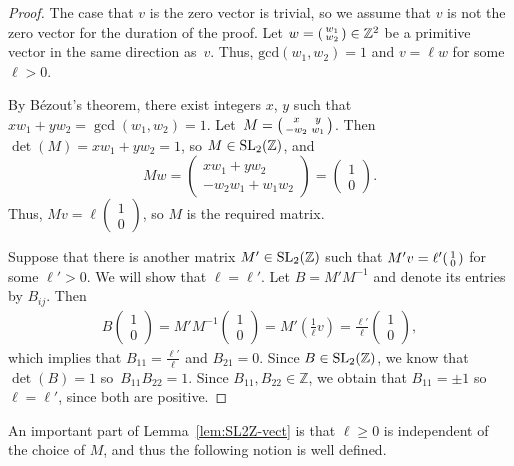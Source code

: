 \documentclass[10pt,a4paper]{amsart}
\numberwithin{equation}{section}
\newenvironment{psmallmatrix}
 {\left(\begin{smallmatrix}}
 {\end{smallmatrix}\right)}
\def\Z{{\mathbb Z}}
\newcommand{\SL}{{\rm SL}_2(\Z)}
\newcommand{\vect}[2]{\begin{psmallmatrix} #1 \\ #2 \end{psmallmatrix}}
\theoremstyle{definition}
\theoremstyle{plain}
\theoremstyle{plain}
\begin{document}
\begin{proof}
The case that $v$ is the zero vector is trivial, so we assume that $v$ is not the zero vector for the duration of the proof.
Let $w=\vect{w_1}{w_2}\in\Z^2$ be a primitive vector in the same direction as~$v$.
Thus, $\mathrm{gcd}(w_1,w_2)=1$ and $v = \ell w$ for some $\ell>0$.

By B\'{e}zout's theorem, there exist integers $x$, $y$ such that $xw_1 + yw_2 = \gcd (w_1,w_2) = 1$. Let~$M = \begin{psmallmatrix} x & y \\ -w_2 & w_1 \end{psmallmatrix}$. Then~$\det(M) = xw_1 +yw_2 =1$, so $M \in \SL$, and
\[
Mw =\begin{pmatrix}
xw_1+yw_2 \\ -w_2w_1+w_1w_2 \end{pmatrix} = \begin{pmatrix} 1\\ 0\end{pmatrix}.
\]
Thus, $Mv = \ell \left(\begin{smallmatrix}  1\\ 0\end{smallmatrix} \right)$, so $M$ is the required matrix.

Suppose that there is another matrix $M' \in \SL$ such that $M' v = \ell' \vect{1}{0}$ for some $\ell'>0$. We will show that $\ell = \ell' $. Let $B = M'M^{-1}$ and denote its entries by $B_{ij}$. Then
\begin{align*}\label{eq:sl_h2}
 B \begin{pmatrix} 1\\ 0\end{pmatrix} = M' M^{-1}\begin{pmatrix} 1\\ 0\end{pmatrix} = M' \left( \frac{1}{\ell} v \right) = \frac{\ell'}{\ell} \begin{pmatrix} 1\\ 0\end{pmatrix} ,
\end{align*}
which implies that $B_{11} = \frac{\ell'}{\ell}$ and $B_{21} = 0$. Since $B \in \SL$, we know that $\det(B) = 1$ so~$B_{11} B_{22} = 1$. Since $B_{11}, B_{22}\in \mathbb{Z}$, we obtain that $B_{11} = \pm 1$ so $\ell = \ell'$, since both are positive.
\end{proof}



An important part of Lemma~\ref{lem:SL2Z-vect} is that $\ell\geq 0$ is independent of the choice of $M$, and thus the following notion is well defined.
\end{document}
